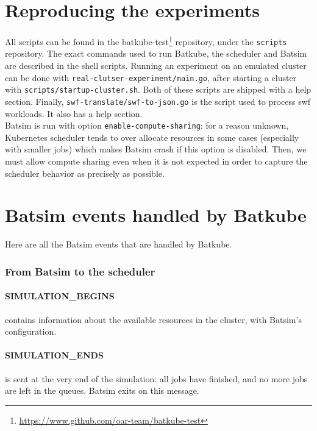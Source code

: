 \section{Reproducing the experiments} \label{sec:reproduce-expes}

All scripts can be found in the
batkube-test\footnote{\url{https://www.github.com/oar-team/batkube-test}} repository, under the
\texttt{scripts} repository. The exact commands used to run Batkube, the
scheduler and Batsim are described in the shell scripts. Running an experiment
on an emulated cluster can be done with
\texttt{real-clutser-experiment/main.go}, after starting a cluster with
\texttt{scripts/startup-cluster.sh}. Both of these scripts are shipped with a
help section. Finally, \texttt{swf-translate/swf-to-json.go} is the script used
to process swf workloads. It also has a help section.\\

Batsim is run with option \texttt{enable-compute-sharing}: for a reason
unknown, Kubernetes scheduler tends to over allocate resources in some cases
(especially with smaller jobs) which makes Batsim crash if this option is
disabled. Then, we must allow compute sharing even when it is not expected in
order to capture the scheduler behavior as precisely as possible.\\

\section{Batsim events handled by Batkube} \label{sec:batmsg-list}

Here are all the Batsim events that are handled by Batkube.

\subsubsection{From Batsim to the scheduler}

\paragraph{SIMULATION\_BEGINS}
contains information about the available resources in the cluster, with
Batsim's configuration.

\paragraph{SIMULATION\_ENDS}
is sent at the very end of the simulation: all jobs have finished, and no more
jobs are left in the queues. Batsim exits on this message.

